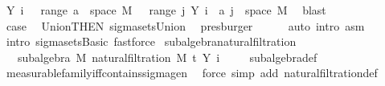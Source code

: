 \begin{isabellebody}
\ {\isachardoublequoteopen}Y\ i\ {\isacharminus}{\kern0pt}{\isacharbackquote}{\kern0pt}\ {\isasymUnion}\ {\isacharparenleft}{\kern0pt}range\ a{\isacharparenright}{\kern0pt}\ {\isasyminter}\ space\ M\ {\isacharequal}{\kern0pt}\ {\isasymUnion}\ {\isacharparenleft}{\kern0pt}range\ {\isacharparenleft}{\kern0pt}{\isasymlambda}j{\isachardot}{\kern0pt}\ Y\ i\ {\isacharminus}{\kern0pt}{\isacharbackquote}{\kern0pt}\ a\ j\ {\isasyminter}\ space\ M{\isacharparenright}{\kern0pt}{\isacharparenright}{\kern0pt}{\isachardoublequoteclose}\ \isamarkupfalse%
\ blast\isanewline
\ \ \ \ \ \ \isamarkupfalse%
\ \isamarkupfalse%
\ {\isacharquery}{\kern0pt}case\ \isamarkupfalse%
\ Union{\isacharparenleft}{\kern0pt}{}{\isacharparenright}{\kern0pt}{\isacharbrackleft}{\kern0pt}THEN\ sigma{\isacharunderscore}{\kern0pt}sets{\isachardot}{\kern0pt}Union{\isacharbrackright}{\kern0pt}\ \isamarkupfalse%
\ presburger\isanewline
\ \ \ \ \isamarkupfalse%
\ {\isacharparenleft}{\kern0pt}auto\ intro{\isacharcolon}{\kern0pt}\ asm{\isacharparenright}{\kern0pt}\isanewline
\ \ \isamarkupfalse%
\ {\isacharparenleft}{\kern0pt}intro\ sigma{\isacharunderscore}{\kern0pt}sets{\isachardot}{\kern0pt}Basic{\isacharcomma}{\kern0pt}\ fastforce{\isacharparenright}{\kern0pt}\isanewline
{}\isamarkupfalse%
%
\endisatagproof
{\isafoldproof}%
%
\isadelimproof
\isanewline
%
\endisadelimproof
\isanewline
{}\isamarkupfalse%
\ subalgebra{\isacharunderscore}{\kern0pt}natural{\isacharunderscore}{\kern0pt}filtration{\isacharcolon}{\kern0pt}\ \isanewline
\ \ \ {\isachardoublequoteopen}subalgebra\ M\ {\isacharparenleft}{\kern0pt}natural{\isacharunderscore}{\kern0pt}filtration\ M\ t\ Y\ i{\isacharparenright}{\kern0pt}{\isachardoublequoteclose}\ \isanewline
%
\isadelimproof
\ \ %
\endisadelimproof
%
\isatagproof
{}\isamarkupfalse%
\ subalgebra{\isacharunderscore}{\kern0pt}def\ \isamarkupfalse%
\ measurable{\isacharunderscore}{\kern0pt}family{\isacharunderscore}{\kern0pt}iff{\isacharunderscore}{\kern0pt}contains{\isacharunderscore}{\kern0pt}sigma{\isacharunderscore}{\kern0pt}gen\ \isamarkupfalse%
\ {\isacharparenleft}{\kern0pt}force\ simp\ add{\isacharcolon}{\kern0pt}\ natural{\isacharunderscore}{\kern0pt}filtration{\isacharunderscore}{\kern0pt}def{\isacharparenright}{\kern0pt}%
\endisatagproof
{\isafoldproof}%
%
\isadelimproof
\isanewline
%
\endisadelimproof
\isanewline
{}\isamarkupfalse%

\end{isabellebody}
